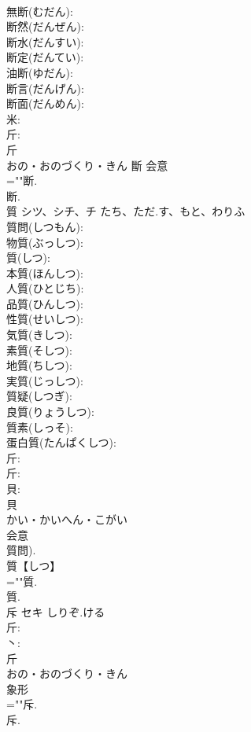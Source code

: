\documentclass[8pt]{extreport}
\begin{document}
\begin{CJK}{UTF8}{min}
\\	無断(むだん): 
\\	断然(だんぜん): 
\\	断水(だんすい): 
\\	断定(だんてい): 
\\	油断(ゆだん): 
\\	断言(だんげん): 
\\	断面(だんめん): 
\\	米: 
\\	斤: 
\\	斤	
\\	おの・おのづくり・きん	斷	会意 
\\	=""断.
\\	断.
\\	質	シツ、シチ、チ	たち、ただ.す、もと、わりふ		
\\	質問(しつもん): 
\\	物質(ぶっしつ): 
\\	質(しつ): 
\\	本質(ほんしつ): 
\\	人質(ひとじち): 
\\	品質(ひんしつ): 
\\	性質(せいしつ): 
\\	気質(きしつ): 
\\	素質(そしつ): 
\\	地質(ちしつ): 
\\	実質(じっしつ): 
\\	質疑(しつぎ): 
\\	良質(りょうしつ): 
\\	質素(しっそ): 
\\	蛋白質(たんぱくしつ): 
\\	斤: 
\\	斤: 
\\	貝: 
\\	貝	
\\	かい・かいへん・こがい	
\\	会意 
\\	質問).	
\\	質【しつ】 
\\	=""質.
\\	質.
\\	斥	セキ	しりぞ.ける		
\\	斤: 
\\	丶: 
\\	斤	
\\	おの・おのづくり・きん	
\\	象形 
\\	=""斥.
\\	斥.

\end{CJK}
\end{document}
